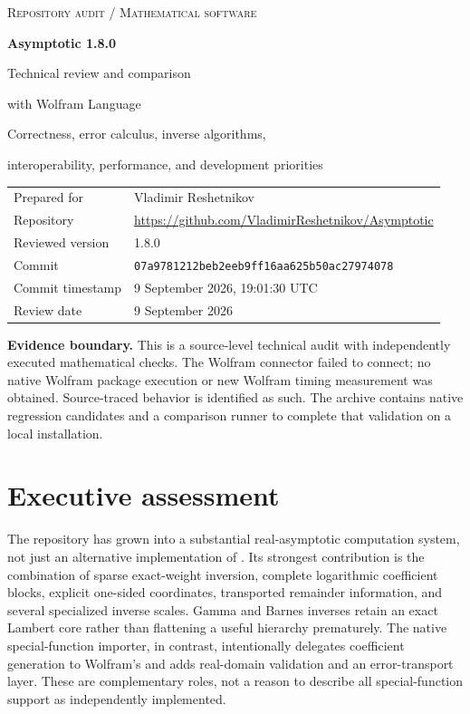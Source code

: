 \documentclass[11pt,letterpaper]{article}
\newcommand{\code}[1]{\texttt{\small\detokenize{#1}}}
\newcommand{\commit}{\texttt{07a9781212beb2eeb9ff16aa625b50ac27974078}}
\begin{document}
\begin{titlepage}
\vspace*{0.55in}
{\Large\color{ink}\textsc{Repository audit / Mathematical software}}\par
\vspace{0.3in}
{\Huge\bfseries Asymptotic 1.8.0}\par
\vspace{0.15in}
{\LARGE Technical review and comparison\par with Wolfram Language}\par
\vspace{0.4in}
{\large Correctness, error calculus, inverse algorithms,\par interoperability, performance, and development priorities}\par
\vspace{0.55in}
\begin{tabular}{@{}ll}
Prepared for & Vladimir Reshetnikov\\[5pt]
Repository & \url{https://github.com/VladimirReshetnikov/Asymptotic}\\[5pt]
Reviewed version & 1.8.0\\[5pt]
Commit & \commit\\[5pt]
Commit timestamp & 9 September 2026, 19:01:30 UTC\\[5pt]
Review date & 9 September 2026
\end{tabular}
\vfill
\begin{notebox}
\textbf{Evidence boundary.} This is a source-level technical audit with independently executed mathematical checks. The Wolfram connector failed to connect; no native Wolfram package execution or new Wolfram timing measurement was obtained. Source-traced behavior is identified as such. The archive contains native regression candidates and a comparison runner to complete that validation on a local installation.
\end{notebox}
\end{titlepage}

\section*{Executive assessment}
The repository has grown into a substantial real-asymptotic computation system, not just an alternative implementation of \code{InverseSeries}. Its strongest contribution is the combination of sparse exact-weight inversion, complete logarithmic coefficient blocks, explicit one-sided coordinates, transported remainder information, and several specialized inverse scales. Gamma and Barnes inverses retain an exact Lambert core rather than flattening a useful hierarchy prematurely. The native special-function importer, in contrast, intentionally delegates coefficient generation to Wolfram's \code{Series} and adds real-domain validation and an error-transport layer. These are complementary roles, not a reason to describe all special-function support as independently implemented.\cite{repo-guide,repo-core,repo-gamma,repo-native}
\end{document}
